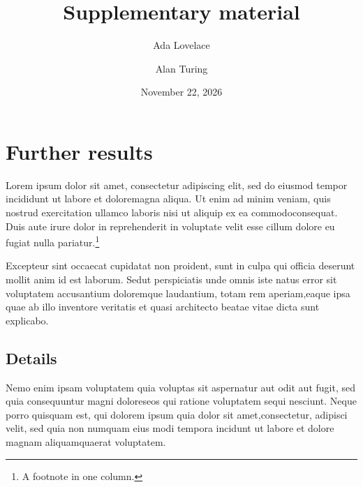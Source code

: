 \documentclass[aps,pra,superscriptaddress,10pt,nofootinbib]{revtex4-2}
\begin{document}
\title{Supplementary material}
\author{Ada Lovelace}
\author{Alan Turing}
\noaffiliation
\date{November 22, 2026}
\maketitle
\section{Further results}
Lorem ipsum dolor sit amet, consectetur adipiscing elit, sed do eiusmod tempor incididunt ut labore et dolore\linebreak magna aliqua. Ut enim ad minim veniam, quis nostrud exercitation ullamco laboris nisi ut aliquip ex ea commodo\linebreak consequat. Duis aute irure dolor in reprehenderit in voluptate velit esse cillum dolore eu fugiat nulla pariatur.\footnote{A footnote in one column.}

Excepteur sint occaecat cupidatat non proident, sunt in culpa qui officia deserunt mollit anim id est laborum. Sed\linebreak ut perspiciatis unde omnis iste natus error sit voluptatem accusantium doloremque laudantium, totam rem aperiam,\linebreak eaque ipsa quae ab illo inventore veritatis et quasi architecto beatae vitae dicta sunt explicabo.
\subsection{Details}
Nemo enim ipsam voluptatem quia voluptas sit aspernatur aut odit aut fugit, sed quia consequuntur magni dolores\linebreak eos qui ratione voluptatem sequi nesciunt. Neque porro quisquam est, qui dolorem ipsum quia dolor sit amet,\linebreak consectetur, adipisci velit, sed quia non numquam eius modi tempora incidunt ut labore et dolore magnam aliquam\linebreak quaerat voluptatem.
\end{document}

